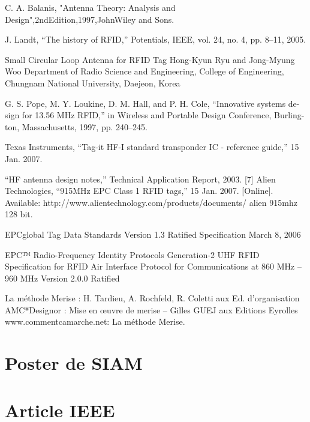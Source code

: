 \documentclass[11pt, a4paper, twoside]{book}
\begin{document}
\begin{thebibliography}{9}

C. A. Balanis, "Antenna Theory: Analysis and
Design",2ndEdition,1997,JohnWiley and Sons.
 



  J. Landt, “The history of RFID,” Potentials, IEEE, vol. 24, no. 4, pp. 8–11, 2005.

 Small Circular Loop Antenna for RFID Tag
Hong-Kyun Ryu and Jong-Myung Woo
Department of Radio Science and Engineering, College of Engineering, Chungnam National University, Daejeon, Korea

 G. S. Pope, M. Y. Loukine, D. M. Hall, and P. H. Cole, “Innovative systems de- sign for 13.56 MHz RFID,” in Wireless and Portable Design Conference, Burling- ton, Massachusetts, 1997, pp. 240–245.

  Texas Instruments, “Tag-it HF-I standard transponder IC - reference guide,” 15 Jan. 2007. 

  “HF antenna design notes,” Technical Application Report, 2003.
[7] Alien Technologies, “915MHz EPC Class 1 RFID tags,” 15 Jan. 2007. [Online]. Available: http://www.alientechnology.com/products/documents/
alien 915mhz 128 bit.%

  EPCglobal Tag Data Standards Version 1.3 Ratified Specification
March 8, 2006

 EPC™ Radio-Frequency Identity Protocols Generation-2 UHF RFID
Specification for RFID Air Interface Protocol for Communications at 860 MHz – 960 MHz 
Version 2.0.0 Ratified

  La méthode Merise : H. Tardieu, A. Rochfeld, R. Coletti aux Ed. d’organisation
AMC*Designor : Mise en œuvre de merise – Gilles GUEJ aux Editions Eyrolles
www.commentcamarche.net: La méthode Merise. 

\end{thebibliography}
\let\cleardoublepage\clearpage

\appendix
\printnomenclature
\chapter{Poster de SIAM}


\chapter{Article IEEE}


\end{document}
